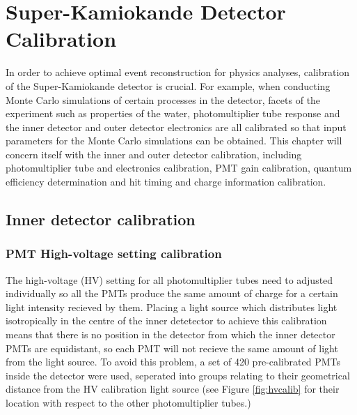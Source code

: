 \chapter{Super-Kamiokande Detector Calibration}
\label{chp:superkcalib}

In order to achieve optimal event reconstruction for physics analyses, calibration of the Super-Kamiokande detector is crucial. For example, when conducting Monte Carlo simulations of certain processes in the detector, facets of the experiment such as properties of the water, photomultiplier tube response and the inner detector and outer detector electronics are all calibrated so that input parameters for the Monte Carlo simulations can be obtained. This chapter will concern itself with the inner and outer detector calibration, including photomultiplier tube and electronics calibration, PMT gain calibration, quantum efficiency determination and hit timing and charge information calibration. 

\section{Inner detector calibration}

\subsection{PMT High-voltage setting calibration}

The high-voltage (HV) setting for all photomultiplier tubes need to adjusted individually so all the PMTs produce the same amount of charge for a certain light intensity recieved by them. Placing a light source which distributes light isotropically in the centre of the inner detetector to achieve this calibration means that there is no position in the detector from which the inner detector PMTs are equidistant, so each PMT will not recieve the same amount of light from the light source. To avoid this problem, a set of 420 pre-calibrated PMTs inside the detector were used, seperated into groups relating to their geometrical distance from the HV calibration light source (see Figure \ref{fig:hvcalib} for their location with respect to the other photomultiplier tubes.)

